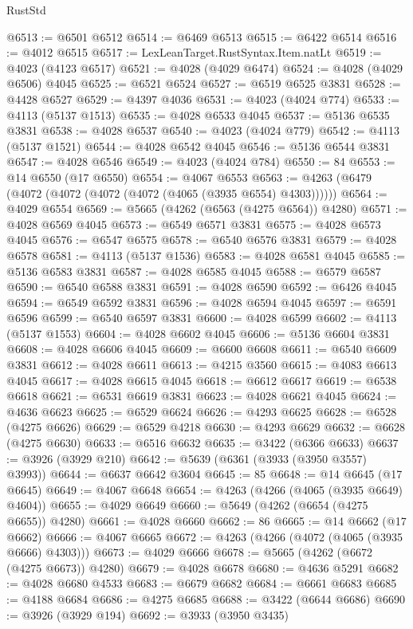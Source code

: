 \begin{lexlean}{RustStd}
\begin{coremodule}
@6513 := @6501 @6512
@6514 := @6469 @6513
@6515 := @6422 @6514
@6516 := @4012 @6515
@6517 := LexLeanTarget.RustSyntax.Item.natLt
@6519 := @4023 (@4123 @6517)
@6521 := @4028 (@4029 @6474)
@6524 := @4028 (@4029 @6506) @4045
@6525 := @6521 @6524
@6527 := @6519 @6525 @3831
@6528 := @4428 @6527
@6529 := @4397 @4036
@6531 := @4023 (@4024 @774)
@6533 := @4113 (@5137 @1513)
@6535 := @4028 @6533 @4045
@6537 := @5136 @6535 @3831
@6538 := @4028 @6537
@6540 := @4023 (@4024 @779)
@6542 := @4113 (@5137 @1521)
@6544 := @4028 @6542 @4045
@6546 := @5136 @6544 @3831
@6547 := @4028 @6546
@6549 := @4023 (@4024 @784)
@6550 := 84
@6553 := @14 @6550 (@17 @6550)
@6554 := @4067 @6553
@6563 := @4263 (@6479 (@4072 (@4072 (@4072 (@4072 (@4065 (@3935 @6554) @4303))))))
@6564 := @4029 @6554
@6569 := @5665 (@4262 (@6563 (@4275 @6564)) @4280)
@6571 := @4028 @6569 @4045
@6573 := @6549 @6571 @3831
@6575 := @4028 @6573 @4045
@6576 := @6547 @6575
@6578 := @6540 @6576 @3831
@6579 := @4028 @6578
@6581 := @4113 (@5137 @1536)
@6583 := @4028 @6581 @4045
@6585 := @5136 @6583 @3831
@6587 := @4028 @6585 @4045
@6588 := @6579 @6587
@6590 := @6540 @6588 @3831
@6591 := @4028 @6590
@6592 := @6426 @4045
@6594 := @6549 @6592 @3831
@6596 := @4028 @6594 @4045
@6597 := @6591 @6596
@6599 := @6540 @6597 @3831
@6600 := @4028 @6599
@6602 := @4113 (@5137 @1553)
@6604 := @4028 @6602 @4045
@6606 := @5136 @6604 @3831
@6608 := @4028 @6606 @4045
@6609 := @6600 @6608
@6611 := @6540 @6609 @3831
@6612 := @4028 @6611
@6613 := @4215 @3560
@6615 := @4083 @6613 @4045
@6617 := @4028 @6615 @4045
@6618 := @6612 @6617
@6619 := @6538 @6618
@6621 := @6531 @6619 @3831
@6623 := @4028 @6621 @4045
@6624 := @4636 @6623
@6625 := @6529 @6624
@6626 := @4293 @6625
@6628 := @6528 (@4275 @6626)
@6629 := @6529 @4218
@6630 := @4293 @6629
@6632 := @6628 (@4275 @6630)
@6633 := @6516 @6632
@6635 := @3422 (@6366 @6633)
@6637 := @3926 (@3929 @210)
@6642 := @5639 (@6361 (@3933 (@3950 @3557) @3993))
@6644 := @6637 @6642 @3604
@6645 := 85
@6648 := @14 @6645 (@17 @6645)
@6649 := @4067 @6648
@6654 := @4263 (@4266 (@4065 (@3935 @6649) @4604))
@6655 := @4029 @6649
@6660 := @5649 (@4262 (@6654 (@4275 @6655)) @4280)
@6661 := @4028 @6660
@6662 := 86
@6665 := @14 @6662 (@17 @6662)
@6666 := @4067 @6665
@6672 := @4263 (@4266 (@4072 (@4065 (@3935 @6666) @4303)))
@6673 := @4029 @6666
@6678 := @5665 (@4262 (@6672 (@4275 @6673)) @4280)
@6679 := @4028 @6678
@6680 := @4636 @5291
@6682 := @4028 @6680 @4533
@6683 := @6679 @6682
@6684 := @6661 @6683
@6685 := @4188 @6684
@6686 := @4275 @6685
@6688 := @3422 (@6644 @6686)
@6690 := @3926 (@3929 @194)
@6692 := @3933 (@3950 @3435)

\end{coremodule}
\end{lexlean}
